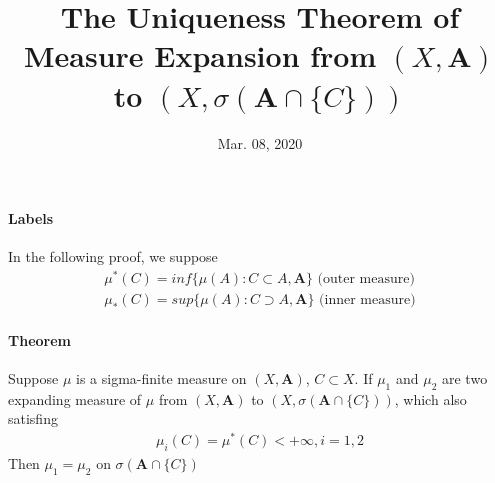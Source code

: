 \documentclass[UTF8]{ctexart}
\theoremstyle{definition}
\begin{document}
\title{The Uniqueness Theorem of Measure Expansion from $(X,\bm{A})$ to $(X,\sigma(\bm{A}\cap\{C\}))$}
\date{Mar. 08, 2020}

\maketitle
\paragraph{Labels} In the following proof, we suppose
\begin{align*}
	\mu^{*}(C) = inf\{\mu(A): C\subset A, \bm{A}\}\text{  (outer measure)}\\
	\mu_{*}(C) = sup\{\mu(A): C\supset A, \bm{A}\}\text{  (inner measure)}
\end{align*}
\paragraph{Theorem} Suppose $\mu$ is a sigma-finite measure on $(X,\bm{A})$, $C\subset X$. If $\mu_1$ and $\mu_2$ are two expanding measure of $\mu$ from $(X,\bm{A})$ to $(X,\sigma(\bm{A}\cap\{C\}))$, which also satisfing
\begin{align*}
	\mu_i(C) = \mu^{*}(C) < +\infty,i=1,2
\end{align*}
Then $\mu_1=\mu_2$ on $\sigma(\bm{A}\cap\{C\})$
\end{document}
